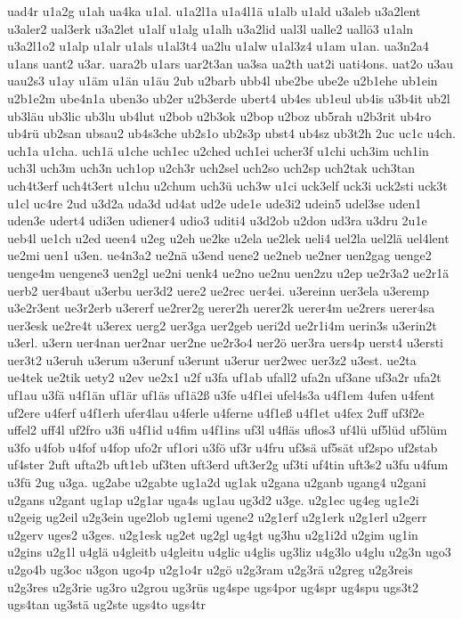 {uad4r
u1a2g
u1ah
ua4ka
u1al.
u1a2l1a
u1a4l1ä
u1alb
u1ald
u3aleb
u3a2lent
u3aler2
ual3erk
u3a2let
u1alf
u1alg
u1alh
u3a2lid
ual3l
ualle2
uallö3
u1aln
u3a2l1o2
u1alp
u1alr
u1als
u1al3t4
ua2lu
u1alw
u1al3z4
u1am
u1an.
ua3n2a4
u1ans
uant2
u3ar.
uara2b
u1ars
uar2t3an
ua3sa
ua2th
uat2i
uati4ons.
uat2o
u3au
uau2s3
u1ay
u1äm
u1än
u1äu
2ub
u2barb
ubb4l
ube2be
ube2e
u2b1ehe
ub1ein
u2b1e2m
ube4n1a
uben3o
ub2er
u2b3erde
ubert4
ub4es
ub1eul
ub4is
u3b4it
ub2l
ub3läu
ub3lic
ub3lu
ub4lut
u2bob
u2b3ok
u2bop
u2boz
ub5rah
u2b3rit
ub4ro
ub4rü
ub2san
ubsau2
ub4s3che
ub2s1o
ub2s3p
ubst4
ub4sz
ub3t2h
2uc
uc1c
u4ch.
uch1a
u1cha.
uch1ä
u1che
uch1ec
u2ched
uch1ei
ucher3f
u1chi
uch3im
uch1in
uch3l
uch3m
uch3n
uch1op
u2ch3r
uch2sel
uch2so
uch2sp
uch2tak
uch3tan
uch4t3erf
uch4t3ert
u1chu
u2chum
uch3ü
uch3w
u1ci
uck3elf
uck3i
uck2sti
uck3t
u1cl
uc4re
2ud
u3d2a
uda3d
ud4at
ud2e
ude1e
ude3i2
udein5
udel3se
uden1
uden3e
udert4
udi3en
udiener4
udio3
uditi4
u3d2ob
u2don
ud3ra
u3dru
2u1e
ueb4l
ue1ch
u2ed
ueen4
u2eg
u2eh
ue2ke
u2ela
ue2lek
ueli4
uel2la
uel2lä
uel4lent
ue2mi
uen1
u3en.
ue4n3a2
ue2nä
u3end
uene2
ue2neb
ue2ner
uen2gag
uenge2
uenge4m
uengene3
uen2gl
ue2ni
uenk4
ue2no
ue2nu
uen2zu
u2ep
ue2r3a2
ue2r1ä
uerb2
uer4baut
u3erbu
uer3d2
uere2
ue2rec
uer4ei.
u3ereinn
uer3ela
u3eremp
u3e2r3ent
ue3r2erb
u3ererf
ue2rer2g
uerer2h
uerer2k
uerer4m
ue2rers
uerer4sa
uer3esk
ue2re4t
u3erex
uerg2
uer3ga
uer2geb
ueri2d
ue2r1i4m
uerin3s
u3erin2t
u3erl.
u3ern
uer4nan
uer2nar
uer2ne
ue2r3o4
uer2ö
uer3ra
uers4p
uerst4
u3ersti
uer3t2
u3eruh
u3erum
u3erunf
u3erunt
u3erur
uer2wec
uer3z2
u3est.
ue2ta
ue4tek
ue2tik
uety2
u2ev
ue2x1
u2f
u3fa
uf1ab
ufall2
ufa2n
uf3ane
uf3a2r
ufa2t
uf1au
u3fä
u4f1än
uf1är
uf1äs
uf1ä2ß
u3fe
u4f1ei
ufel4s3a
u4f1em
4ufen
u4fent
uf2ere
u4ferf
u4f1erh
ufer4lau
u4ferle
u4ferne
u4f1eß
u4f1et
u4fex
2uff
uf3f2e
uffel2
uff4l
uf2fro
u3fi
u4f1id
u4fim
u4f1ins
uf3l
u4fläs
uflos3
uf4lü
uf5lüd
uf5lüm
u3fo
u4fob
u4fof
u4fop
ufo2r
uf1ori
u3fö
uf3r
u4fru
uf3sä
uf5sät
uf2spo
uf2stab
uf4ster
2uft
ufta2b
uft1eb
uf3ten
uft3erd
uft3er2g
uf3ti
uf4tin
uft3s2
u3fu
u4fum
u3fü
2ug
u3ga.
ug2abe
u2gabte
ug1a2d
ug1ak
u2gana
u2ganb
ugang4
u2gani
u2gans
u2gant
ug1ap
u2g1ar
uga4s
ug1au
ug3d2
u3ge.
u2g1ec
ug4eg
ug1e2i
u2geig
ug2eil
u2g3ein
uge2lob
ug1emi
ugene2
u2g1erf
u2g1erk
u2g1erl
u2gerr
u2gerv
uges2
u3ges.
u2g1esk
ug2et
ug2gl
ug4gt
ug3hu
u2g1i2d
u2gim
ug1in
u2gins
u2g1l
u4glä
u4gleitb
u4gleitu
u4glic
u4glis
ug3liz
u4g3lo
u4glu
u2g3n
ugo3
u2go4b
ug3oc
u3gon
ugo4p
u2g1o4r
u2gö
u2g3ram
u2g3rä
u2greg
u2g3reis
u2g3res
u2g3rie
ug3ro
u2grou
ug3rüs
ug4spe
ugs4por
ug4spr
ug4spu
ugs3t2
ugs4tan
ug3stä
ug2ste
ugs4to
ugs4tr
}
